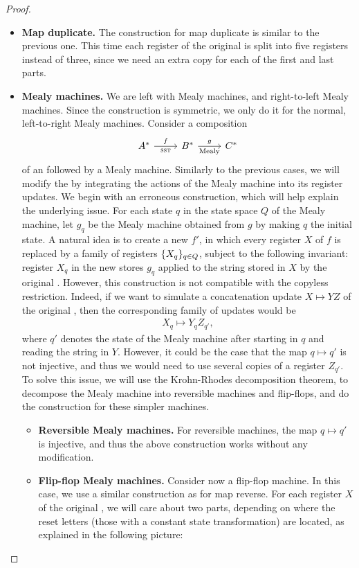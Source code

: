 \begin{proof}
\begin{itemize}
 \item \textbf{Map duplicate.} The construction for map duplicate is similar to the previous one. This time each register of the original \sst is split into five registers instead of three, since we need an extra copy for each of the first and last parts.
 \item \textbf{Mealy machines.} We are left with Mealy machines, and right-to-left Mealy machines. Since the construction is symmetric, we only do it for the normal, left-to-right Mealy machines. Consider a composition 
\[
\begin{tikzcd}
A^* 
\ar[r,"f","\text{\sst}"']
&
B^*
\ar[r,"g","\text{Mealy}"']
&
C^*
\end{tikzcd}
\]
of an \sst followed by a Mealy machine. Similarly to the previous cases, we will modify the \sst by integrating the actions of the Mealy machine into its register updates. We begin with an erroneous construction, which will help explain the underlying issue. For each state $q$ in the state space $Q$ of the Mealy machine, let $g_q$ be the Mealy machine obtained from $g$ by making $q$ the initial state. A natural idea is to create a new \sst $f'$, in which every register $X$ of $f$ is replaced by a family of registers $\{X_q\}_{q \in Q}$, subject to the following invariant: register $X_q$ in the new \sst stores $g_q$ applied to the string stored in $X$ by the original \sst. However, this construction is not compatible with the copyless restriction. Indeed, if we want to simulate a concatenation update $X \mapsto  YZ$ of the original \sst, then the corresponding family of updates would be 
\begin{align*}
 X_q \mapsto  Y_q Z_{q'},
\end{align*}
where $q'$ denotes the state of the Mealy machine after starting in $q$ and reading the string in $Y$. However, it could be the case that the map $q \mapsto q'$ is not injective, and thus we would need to use several copies of a register $Z_{q'}$. To solve this issue, we will use the Krohn-Rhodes decomposition theorem, to decompose the Mealy machine into reversible machines and flip-flops, and do the construction for these simpler machines. 
\begin{itemize}
    \item \textbf{Reversible Mealy machines.} For reversible machines, the map $q \mapsto q'$ is injective, and thus the above construction works without any modification.
    \item \textbf{Flip-flop Mealy machines.} Consider now a flip-flop machine. In this case, we use a similar construction as for map reverse. For each register $X$ of the original \sst, we will care about two parts, depending on where the reset letters (those with a constant state transformation) are located, as explained in the following picture:

\end{itemize}
\end{itemize}
\end{proof}
